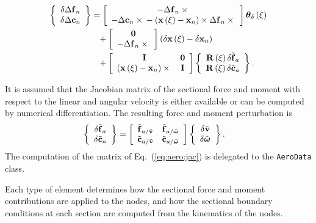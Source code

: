 \begin{align}
	\cubr{\cvvect{
		\delta\Delta\T{f}_n \\
		\delta\Delta\T{c}_n
	}}
	&=
	\sqbr{\cvvect{
		- \Delta\T{f}_n \times{} \\
		- \Delta\T{c}_n \times{}
		- \plbr{\T{x}\plbr{\xi} - \T{x}_n} \times \Delta\T{f}_n \times{}
	}} \T{\theta}_{\delta}\plbr{\xi}
	\nonumber \\
	& \hphantom{= } \mbox{}
	+ \sqbr{\cvvect{
		\TT{0} \\
		- \Delta\T{f}_n \times{}
	}} \plbr{
		\delta\T{x}\plbr{\xi}
		- \delta\T{x}_n
	}
	\nonumber \\
	& \hphantom{= } \mbox{}
	+ \sqbr{\matr{cc}{
		\TT{I} & \TT{0} \\
		\plbr{\T{x}\plbr{\xi} - \T{x}_n} \times{} & \TT{I}
	}} \cubr{\cvvect{
		\TT{R}\plbr{\xi} \delta\tilde{\T{f}}_a \\
		\TT{R}\plbr{\xi} \delta\tilde{\T{c}}_a
	}}
	.
\end{align}

It is assumed that the Jacobian matrix of the sectional force and moment
with respect to the linear and angular velocity
is either available or can be computed by numerical differentiation.
The resulting force and moment perturbation is
\begin{align}
	\cubr{\cvvect{
		\delta\tilde{\T{f}}_a \\
		\delta\tilde{\T{c}}_a
	}} &= \sqbr{\matr{cc}{
		\tilde{\T{f}}_{a/\tilde{\T{v}}} & \tilde{\T{f}}_{a/\tilde{\T{\omega}}} \\
		\tilde{\T{c}}_{a/\tilde{\T{v}}} & \tilde{\T{c}}_{a/\tilde{\T{\omega}}}
	}} \cubr{\cvvect{
		\delta\tilde{\T{v}} \\
		\delta\tilde{\T{\omega}}
	}}
	\label{eq:aero:jac}
	.
\end{align}
The computation of the matrix of Eq.~(\ref{eq:aero:jac})
is delegated to the \texttt{AeroData} class.

Each type of element determines how the sectional force and moment
contributions are applied to the nodes, and how the sectional
boundary conditions at each section are computed from the kinematics
of the nodes.



